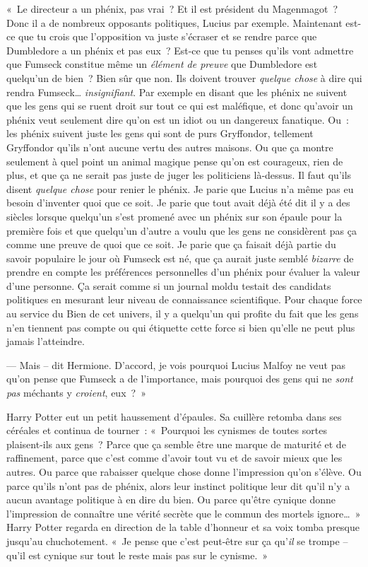 «~Le directeur a un phénix, pas vrai~? Et il est président du Magenmagot~? Donc il a de nombreux opposants politiques, Lucius par exemple. Maintenant est-ce que tu crois que l'opposition va juste s'écraser et se rendre parce que Dumbledore a un phénix et pas eux~? Est-ce que tu penses qu'ils vont admettre que Fumseck constitue même un \emph{élément de preuve} que Dumbledore est quelqu'un de bien~? Bien sûr que non. Ils doivent trouver \emph{quelque chose} à dire qui rendra Fumseck… \emph{insignifiant}. Par exemple en disant que les phénix ne suivent que les gens qui se ruent droit sur tout ce qui est maléfique, et donc qu'avoir un phénix veut seulement dire qu'on est un idiot ou un dangereux fanatique. Ou~: les phénix suivent juste les gens qui sont de purs Gryffondor, tellement Gryffondor qu'ils n'ont aucune vertu des autres maisons. Ou que ça montre seulement à quel point un animal magique pense qu'on est courageux, rien de plus, et que ça ne serait pas juste de juger les politiciens là-dessus. Il faut qu'ils disent \emph{quelque chose} pour renier le phénix. Je parie que Lucius n'a même pas eu besoin d'inventer quoi que ce soit. Je parie que tout avait déjà été dit il y a des siècles lorsque quelqu'un s'est promené avec un phénix sur son épaule pour la première fois et que quelqu'un d'autre a voulu que les gens ne considèrent pas ça comme une preuve de quoi que ce soit. Je parie que ça faisait déjà partie du savoir populaire le jour où Fumseck est né, que ça aurait juste semblé \emph{bizarre} de prendre en compte les préférences personnelles d'un phénix pour évaluer la valeur d'une personne. Ça serait comme si un journal moldu testait des candidats politiques en mesurant leur niveau de connaissance scientifique. Pour chaque force au service du Bien de cet univers, il y a quelqu'un qui profite du fait que les gens n'en tiennent pas compte ou qui étiquette cette force si bien qu'elle ne peut plus jamais l'atteindre.

--- Mais -- dit Hermione. D'accord, je vois pourquoi Lucius Malfoy ne veut pas qu'on pense que Fumseck a de l'importance, mais pourquoi des gens qui ne \emph{sont pas} méchants y \emph{croient}, eux~?~»

Harry Potter eut un petit haussement d'épaules. Sa cuillère retomba dans ses céréales et continua de tourner~: «~Pourquoi les cynismes de toutes sortes plaisent-ils aux gens~? Parce que ça semble être une marque de maturité et de raffinement, parce que c'est comme d'avoir tout vu et de savoir mieux que les autres. Ou parce que rabaisser quelque chose donne l'impression qu'on s'élève. Ou parce qu'ils n'ont pas de phénix, alors leur instinct politique leur dit qu'il n'y a aucun avantage politique à en dire du bien. Ou parce qu'être cynique donne l'impression de connaître une vérité secrète que le commun des mortels ignore…~» Harry Potter regarda en direction de la table d'honneur et sa voix tomba presque jusqu'au chuchotement. «~Je pense que c'est peut-être sur ça qu'\emph{il} se trompe -- qu'il est cynique sur tout le reste mais pas sur le cynisme.~»

